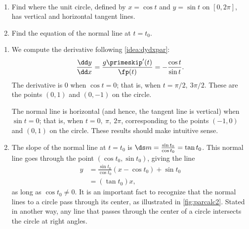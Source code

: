 \begin{example}\label{ex_parcalc2}
\mbox{}\\[-2\baselineskip]\parbox[t]{\linewidth}{\begin{enumerate}
	\item	Find where the unit circle, defined by $x=\cos t$ and $y=\sin t$ on $[0,2\pi]$, has vertical and horizontal tangent lines. 
	\item	 Find the equation of the normal line at $t=t_0$.
\end{enumerate}}\vspace{0pt}
\solution
\begin{enumerate}
	\item We compute the derivative following \autoref{idea:dydxpar}:
	\[\frac{\dd y}{\dd x} = \frac{g\primeskip'(t)}{\fp(t)} = -\frac{\cos t}{\sin t}.\]
	The derivative is $0$ when $\cos t= 0$; that is, when $t=\pi/2,\ 3\pi/2$. These are the points $(0,1)$ and $(0,-1)$ on the circle.

	The normal line is horizontal (and hence, the tangent line is vertical) when $\sin t=0$; that is, when $t= 0,\ \pi,\ 2\pi$, corresponding to the points $(-1,0)$ and $(0,1)$ on the circle. These results should make intuitive sense.
	\item	The slope of the normal line at $t=t_0$ is $\ds m=\frac{\sin t_0}{\cos t_0} = \tan t_0$. This normal line goes through the point $(\cos t_0,\sin t_0)$, giving the line
%
%
%
\begin{align*}
	y &=\frac{\sin t_0}{\cos t_0}(x-\cos t_0) + \sin t_0\\	
	&= (\tan t_0)x,
\end{align*}
as long as $\cos t_0\neq 0$. It is an important fact to recognize that the normal lines to a circle pass through its center, as illustrated in \autoref{fig:parcalc2}. Stated in another way, any line that passes through the center of a circle intersects the circle at right angles.
\end{enumerate}
\end{example}

